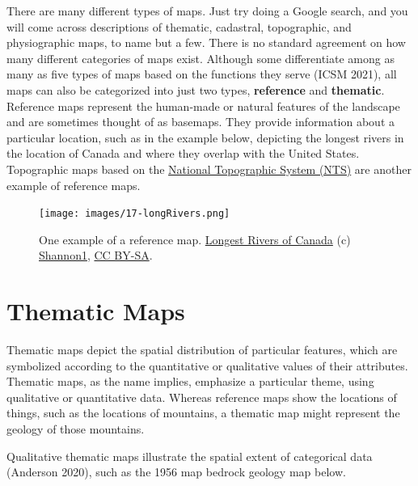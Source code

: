 \documentclass[
]{book}
\begin{document}
There are many different types of maps. Just try doing a Google search, and you will come across descriptions of thematic, cadastral, topographic, and physiographic maps, to name but a few. There is no standard agreement on how many different categories of maps exist. Although some differentiate among as many as five types of maps based on the functions they serve (ICSM 2021), all maps can also be categorized into just two types, \textbf{reference} and \textbf{thematic}. Reference maps represent the human-made or natural features of the landscape and are sometimes thought of as basemaps. They provide information about a particular location, such as in the example below, depicting the longest rivers in the location of Canada and where they overlap with the United States. Topographic maps based on the \href{https://www.nrcan.gc.ca/earth-sciences/geography/topographic-information/maps/national-topographic-system-maps/9767}{National Topographic System (NTS)} are another example of reference maps.

\begin{figure}
\centering
\texttt{[image: images/17-longRivers.png]}
\caption{One example of a reference map. \href{https://en.wikipedia.org/wiki/List_of_longest_rivers_of_Canada\#/media/File:Longest_Rivers_of_Canada.png}{Longest Rivers of Canada} (c) \href{https://en.wikipedia.org/wiki/User:Shannon1}{Shannon1}, \href{https://creativecommons.org/licenses/by-sa/4.0/}{CC BY-SA}.}
\end{figure}

\hypertarget{thematic-maps}{%
\section{Thematic Maps}\label{thematic-maps}}

Thematic maps depict the spatial distribution of particular features, which are symbolized according to the quantitative or qualitative values of their attributes. Thematic maps, as the name implies, emphasize a particular theme, using qualitative or quantitative data. Whereas reference maps show the locations of things, such as the locations of mountains, a thematic map might represent the geology of those mountains.

Qualitative thematic maps illustrate the spatial extent of categorical data (Anderson 2020), such as the 1956 map bedrock geology map below.
\end{document}
